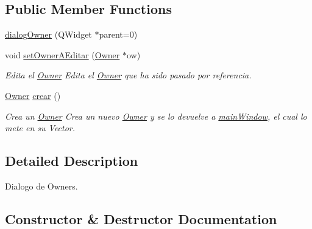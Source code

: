 \subsection*{Public Member Functions}
\begin{DoxyCompactItemize}
\item 
\hyperlink{classdialogOwner_a6d4b17329380be5d0a7aa71452e4e0a0}{dialog\+Owner} (Q\+Widget $\ast$parent=0)
\item 
\hypertarget{classdialogOwner_a9404c326bef5b7e5dfa545c614145274}{}void \hyperlink{classdialogOwner_a9404c326bef5b7e5dfa545c614145274}{set\+Owner\+A\+Editar} (\hyperlink{classOwner}{Owner} $\ast$ow)\label{classdialogOwner_a9404c326bef5b7e5dfa545c614145274}

\begin{DoxyCompactList}\small\item\em Edita el \hyperlink{classOwner}{Owner} Edita el \hyperlink{classOwner}{Owner} que ha sido pasado por referencia. \end{DoxyCompactList}\item 
\hypertarget{classdialogOwner_a1f9fbf03fba92f6133f7e419c34ad23f}{}\hyperlink{classOwner}{Owner} \hyperlink{classdialogOwner_a1f9fbf03fba92f6133f7e419c34ad23f}{crear} ()\label{classdialogOwner_a1f9fbf03fba92f6133f7e419c34ad23f}

\begin{DoxyCompactList}\small\item\em Crea un \hyperlink{classOwner}{Owner} Crea un nuevo \hyperlink{classOwner}{Owner} y se lo devuelve a \hyperlink{classmainWindow}{main\+Window}, el cual lo mete en su Vector. \end{DoxyCompactList}\end{DoxyCompactItemize}


\subsection{Detailed Description}
Dialogo de Owners. 

\subsection{Constructor \& Destructor Documentation}
\hypertarget{classdialogOwner_a6d4b17329380be5d0a7aa71452e4e0a0}{}
